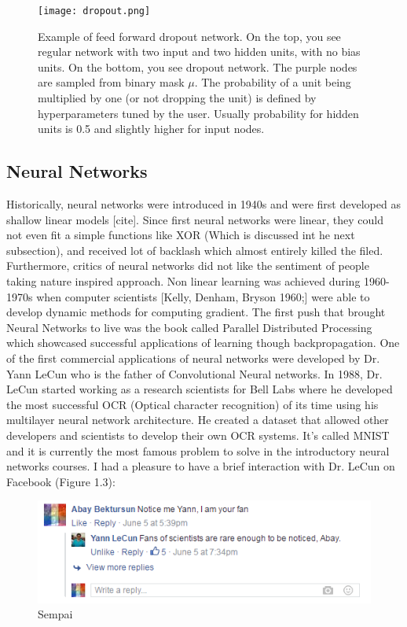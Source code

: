 \documentclass[paper=a4, fontsize=11pt]{scrartcl}
\numberwithin{equation}{section}		%
\numberwithin{figure}{section}			%
\numberwithin{table}{section}			%
\begin{document}
	\begin{figure}[!htb]
		\centering
		\texttt{[image: dropout.png]}
		\caption{Example of feed forward dropout network. On the top, you see regular network with two input and two hidden units, with no bias units. On the bottom, you see dropout network. The purple nodes are sampled from binary mask $\mu$. The probability of a unit being multiplied by one (or not dropping the unit) is defined by hyperparameters tuned by the user. Usually probability for hidden units is 0.5 and slightly higher for input nodes.}
		\label{fig:dropout}
	\end{figure}
	
	\newpage \phantom{}
	\newpage
	\subsection{Neural Networks}
	Historically, neural networks were introduced in 1940s and were first developed as shallow linear models [cite]. Since first neural networks were linear, they could not even fit a simple functions like XOR (Which is discussed int he next subsection), and received lot of backlash which almost entirely killed the filed. Furthermore, critics of neural networks did not like the sentiment of people taking nature inspired approach. Non linear learning was achieved during 1960-1970s when computer scientists [Kelly, Denham, Bryson 1960;] were able to develop dynamic methods for computing gradient.
	The first push that brought Neural Networks to live was the book called Parallel Distributed Processing which showcased successful applications of learning though backpropagation.
	One of the first commercial applications of neural networks were developed by Dr. Yann LeCun who is the father of Convolutional Neural networks. In 1988, Dr. LeCun started working as a research scientists for Bell Labs where he developed the most successful OCR (Optical character recognition) of its time using his multilayer neural network architecture. He created a dataset that allowed other developers and scientists to develop their own OCR systems. It's called MNIST and it is currently the most famous problem to solve in the introductory neural networks courses. I had a pleasure to  have a brief interaction with Dr. LeCun on Facebook (Figure 1.3):
	\begin{figure}[!htb]
		\centering
		\includegraphics[scale=0.55]{sempai.PNG}
		\caption{Sempai}
		\label{fig:sempai}
	\end{figure}
\end{document}
